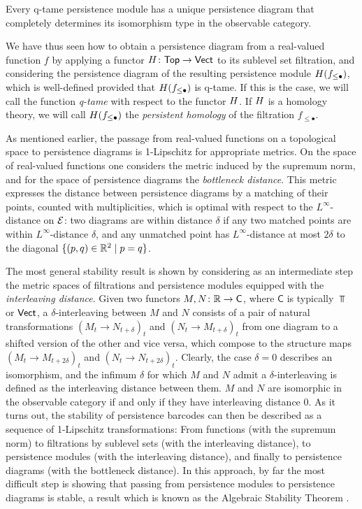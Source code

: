 \begin{thm} \label{t:q-tame modules have barcodes}
	Every q-tame persistence module has a unique persistence diagram that completely determines its isomorphism type in the observable category.
\end{thm}

We have thus seen how to obtain a persistence diagram from a real-valued function $f$ by applying a functor $H \colon \mathsf{Top} \to \mathsf{Vect}$ to its sublevel set filtration, and considering the persistence diagram of the resulting persistence module $H(f_{\leq \bullet})$, which is well-defined provided that $H(f_{\leq \bullet})$ is q-tame.
If this is the case, we will call the function \emph{q-tame} with respect to the functor $H$.
If $H$ is a homology theory, we will call $H(f_{\leq \bullet})$ the \emph{persistent homology} of the filtration $f_{\leq \bullet}$.

As mentioned earlier, the passage from real-valued functions on a topological space to persistence diagrams is 1-Lipschitz for appropriate metrics.
On the space of real-valued functions one considers the metric induced by the supremum norm, and for the space of persistence diagrams the \emph{bottleneck distance}.
This metric expresses the distance between persistence diagrams by a matching of their points, counted with multiplicities, which is optimal with respect to the $L^{\infty}$-distance on $\mathcal{E}$: two diagrams are within distance $\delta$ if any two matched points are within $L^{\infty}$-distance $\delta$, and any unmatched point has $L^{\infty}$-distance at most $2\delta$ to the diagonal $\{(p,q) \in \mathbb{R}^2 \mid p = q\}$.

The most general stability result is shown by considering as an intermediate step the metric spaces of filtrations and persistence modules equipped with the \emph{interleaving distance}.
Given two functors $M,N \colon \mathbb{R} \to \mathsf C$, where $\mathsf C$ is typically $\Top$ or $\mathsf{Vect}$, a $\delta$-interleaving between $M$ and $N$ consists of a pair of natural transformations $(M_t \to N_{t+\delta})_t$ and $(N_t \to M_{t+\delta})_t$ from one diagram to a shifted version of the other and vice versa, which compose to the structure maps $(M_t \to M_{t+2\delta})_t$ and $(N_t \to N_{t+2\delta})_t$.
Clearly, the case $\delta=0$ describes an isomorphism, and the infimum $\delta$ for which $M$ and $N$ admit a $\delta$-interleaving is defined as the interleaving distance between them.
$M$ and $N$ are isomorphic in the observable category if and only if they have interleaving distance $0$.
As it turns out, the stability of persistence barcodes can then be described as a sequence of 1-Lipschitz transformations: From functions (with the supremum norm) to filtrations by sublevel sets (with the interleaving distance), to persistence modules (with the interleaving distance), and finally to persistence diagrams (with the bottleneck distance).
In this approach, by far the most difficult step is showing that passing from persistence modules to persistence diagrams is stable, a result which is known as the Algebraic Stability Theorem \cite{Chazal.2009, Chazal.2016a, Bauer.2015, Cohen-Steiner.2007}.
